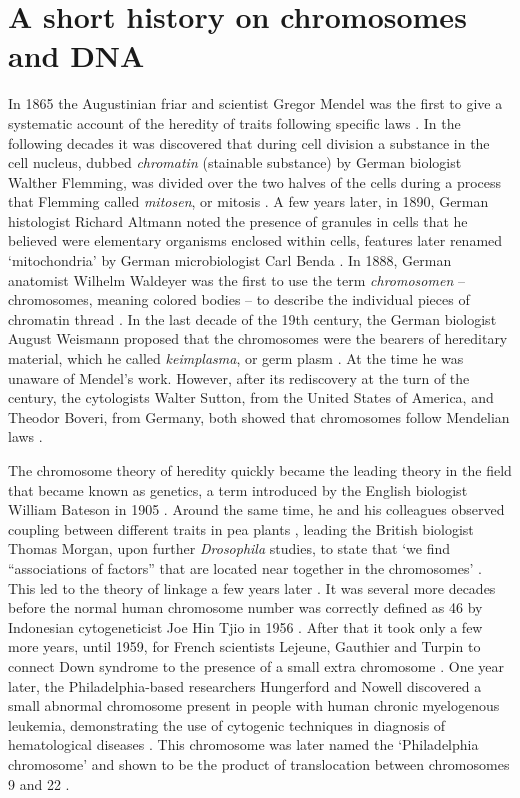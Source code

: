 \section{A short history on chromosomes and DNA} \label{intro_history}
In 1865 the Augustinian friar and scientist Gregor Mendel was the first to give a systematic account of the heredity of traits following specific laws \cite{Mendel_1866}. 
In the following decades it was discovered that during cell division a substance in the cell nucleus, dubbed \textsl{chromatin} (stainable substance) by German biologist Walther Flemming, was divided over the two halves of the cells during a process that Flemming called \textsl{mitosen}, or mitosis \cite{Schneider_1873,Flemming_1882,Cremer_2006}. 
A few years later, in 1890, German histologist Richard Altmann noted the presence of granules in cells that he believed were elementary organisms enclosed within cells, features later renamed ‘mitochondria’ by German microbiologist Carl Benda \cite{Altmann_1894,Benda_1898}. 
In 1888, German anatomist Wilhelm Waldeyer was the first to use the term \textsl{chromosomen} – chromosomes, meaning colored bodies – to describe the individual pieces of chromatin thread \cite{Waldeyer_1888,Cremer_2006}. 
In the last decade of the 19th century, the German biologist August Weismann proposed that the chromosomes were the bearers of hereditary material, which he called \textsl{keimplasma}, or germ plasm \cite{Weismann_1892}. 
At the time he was unaware of Mendel’s work. However, after its rediscovery at the turn of the century, the cytologists Walter Sutton, from the United States of America, and Theodor Boveri, from Germany, both showed that chromosomes follow Mendelian laws \cite{Sutton_1902,Boveri_1904,Boveri_1909,Crow_2002}. 

The chromosome theory of heredity quickly became the leading theory in the field that became known as genetics, a term introduced by the English biologist William Bateson in 1905 \cite{Keynes_2008}. 
Around the same time, he and his colleagues observed coupling between different traits in pea plants \cite{Bateson_1906,Lobo_2008}, leading the British biologist Thomas Morgan, upon further \textsl{Drosophila} studies, to state that ‘we find “associations of factors” that are located near together in the chromosomes’ \cite{Morgan_1911}. 
This led to the theory of linkage a few years later \cite{Morgan_1915}. 
It was several more decades before the normal human chromosome number was correctly defined as 46 by Indonesian cytogeneticist Joe Hin Tjio in 1956 \cite{Tjio_1956}. 
After that it took only a few more years, until 1959, for French scientists Lejeune, Gauthier and Turpin to connect Down syndrome to the presence of a small extra chromosome \cite{Lejeune_1959}.
One year later, the Philadelphia-based researchers Hungerford and Nowell discovered a small abnormal chromosome present in people with human chronic myelogenous leukemia, demonstrating the use of cytogenic techniques in diagnosis of hematological diseases \cite{Nowell_1960}. 
This chromosome was later named the ‘Philadelphia chromosome’ and shown to be the product of translocation between chromosomes 9 and 22 \cite{Rowley_1973}.

